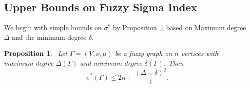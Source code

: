 \documentclass[12pt]{amsart}
\newtheorem{proposition}{Proposition}[section]
\newcommand{\SF}{\sigma^*}
\begin{document}
\subsection{Upper Bounds on Fuzzy Sigma Index}
We begin with simple bounds on $\SF$ by Proposition~\ref{Boundsfuzzy01} based on Maximum degree $\Delta$ and the minimum degree $\delta$. 
\begin{proposition}~\label{Boundsfuzzy01}
Let $\Gamma=(V, \nu,\mu)$ be a fuzzy graph on $n$ vertices with  maximum degree $\Delta(\Gamma)$ and minimum degree $\delta(\Gamma)$. Then
\begin{equation}~\label{eqq1Boundsfuzzy01}
\SF(\Gamma)\leqslant 2n+\frac{(\Delta-\delta)^2}{4}.
\end{equation}
\end{proposition}
\end{document}
